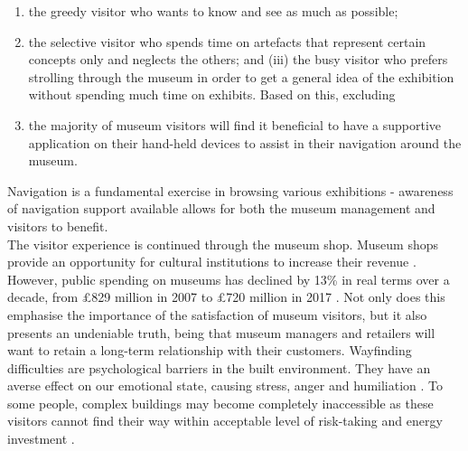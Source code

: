 \begin{enumerate}
\item the greedy visitor who wants to know and see as much as possible;
\item the selective visitor who spends time on artefacts that represent certain concepts only and neglects the others; and (iii) the busy visitor who prefers strolling through the museum in order to get a general idea of the exhibition without spending much time on exhibits. Based on this, excluding  
\item the majority of museum visitors will find it beneficial to have a supportive application on their hand-held devices to assist in their navigation around the museum.
\end{enumerate}
Navigation is a fundamental exercise in browsing various exhibitions - awareness of navigation support available allows for both the museum management and visitors to benefit.\\

The visitor experience is continued through the museum shop. Museum shops provide an opportunity for cultural institutions to increase their revenue \cite{murphy}. However, public spending on museums has declined by 13\% in real terms over a decade, from £829 million in 2007 to £720 million in 2017 \cite{pickford}. Not only does this emphasise the importance of the satisfaction of museum visitors, but it also presents an undeniable truth, being that museum managers and retailers will want to
retain a long-term relationship with their customers. Wayfinding difficulties are psychological barriers in the built environment. They have an averse effect on our emotional state, causing stress, anger and humiliation \cite{Ecology}. To some people, complex buildings may become completely inaccessible as these visitors cannot find their way within acceptable level of risk-taking and energy investment \cite{Wayfinding}.\\ 

